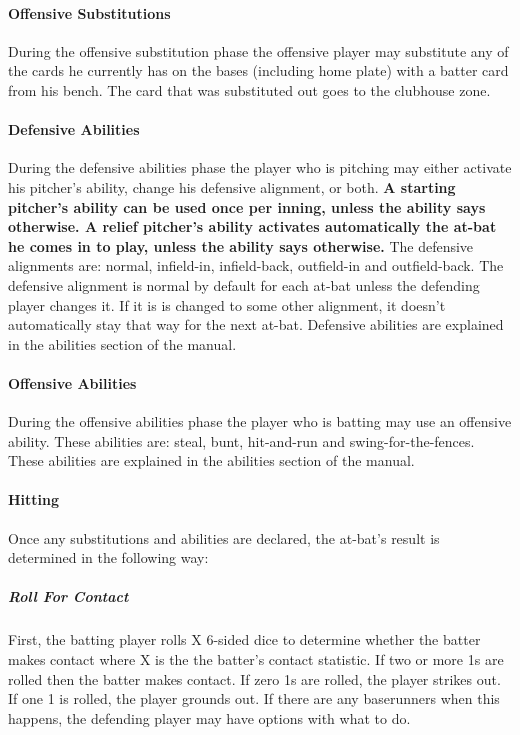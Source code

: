 \documentclass[12pt]{article} %
\begin{document}
\paragraph{Offensive Substitutions}
During the offensive substitution phase the offensive player may substitute any of the cards he currently has on the bases (including home plate) with a batter card from his bench.  The card that was substituted out goes to the clubhouse zone.

\paragraph{Defensive Abilities}
During the defensive abilities phase the player who is pitching may either activate his pitcher's ability, change his defensive alignment, or both.  \textbf{A starting pitcher's ability can be used once per inning, unless the ability says otherwise.  A relief pitcher's ability activates automatically the at-bat he comes in to play, unless the ability says otherwise.}  The defensive alignments are: normal, infield-in, infield-back, outfield-in and outfield-back.  The defensive alignment is normal by default for each at-bat unless the defending player changes it.  If it is is changed to some other alignment, it doesn't automatically stay that way for the next at-bat.  Defensive abilities are explained in the abilities section of the manual.

\paragraph{Offensive Abilities}
During the offensive abilities phase the player who is batting may use an offensive ability.  These abilities are: steal, bunt, hit-and-run and swing-for-the-fences.  These abilities are explained in the abilities section of the manual.

\paragraph{Hitting}
Once any substitutions and abilities are declared, the at-bat's result is determined in the following way:

\subparagraph{Roll For Contact}
First, the batting player rolls X 6-sided dice to determine whether the batter makes contact where X is the the batter's contact statistic.  If two or more 1s are rolled then the batter makes contact.  If zero 1s are rolled, the player strikes out.  If one 1 is rolled, the player grounds out.  If there are any baserunners when this happens, the defending player may have options with what to do.
\end{document}
